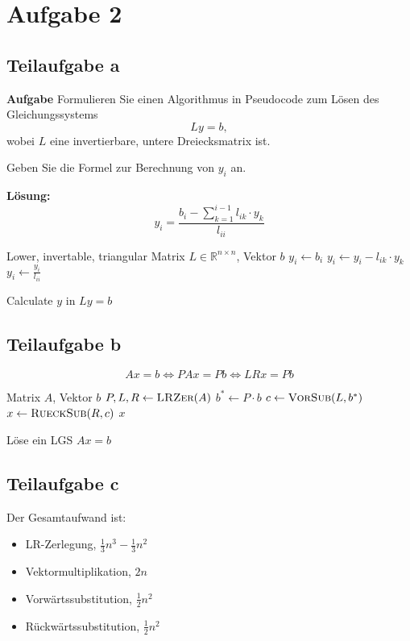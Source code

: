 \section*{Aufgabe 2}
\subsection*{Teilaufgabe a}
\textbf{Aufgabe}
Formulieren Sie einen Algorithmus in Pseudocode zum Lösen des Gleichungssystems
\[Ly = b,\]
wobei $L$ eine invertierbare, untere Dreiecksmatrix ist.

Geben Sie die Formel zur Berechnung von $y_i$ an.

\textbf{Lösung:}
\[y_i = \frac{b_i - \sum_{k=1}^{i-1} l_{ik} \cdot y_k}{l_{ii}}\]

\begin{algorithm}[H]
    \begin{algorithmic}
    \Require Lower, invertable, triangular Matrix $L \in \mathbb{R}^{n \times n}$, Vektor $b$
			\State $y_i \gets b_i$
				\State $y_i \gets y_i - l_{ik} \cdot y_k$
			\EndFor
			\State $y_i \gets \frac{y_i}{l_{ii}}$
		\EndFor
	\EndProcedure
    \end{algorithmic}
\caption{Calculate $y$ in $Ly = b$}
\end{algorithm}

\subsection*{Teilaufgabe b}
\[Ax = b \Leftrightarrow PAx = Pb \Leftrightarrow LRx = Pb \]

\begin{algorithm}[H]
    \begin{algorithmic}
    \Require Matrix $A$, Vektor $b$
    	\State $P, L, R \gets \Call{LRZer}{A}$
		\State $b^* \gets P \cdot b$
		\State $c \gets \Call{VorSub}{L, b^*}$
		\State $x \gets \Call{RueckSub}{R, c}$
		\State \Return $x$
	\EndProcedure
    \end{algorithmic}
\caption{Löse ein LGS $Ax = b$}
\end{algorithm}

\subsection*{Teilaufgabe c}
Der Gesamtaufwand ist:
\begin{itemize}
	\item LR-Zerlegung, $\frac{1}{3}n^3 - \frac{1}{3} n^2$
	\item Vektormultiplikation, $2n$
	\item Vorwärtssubstitution, $\frac{1}{2} n^2$
	\item Rückwärtssubstitution, $\frac{1}{2} n^2$
\end{itemize}
